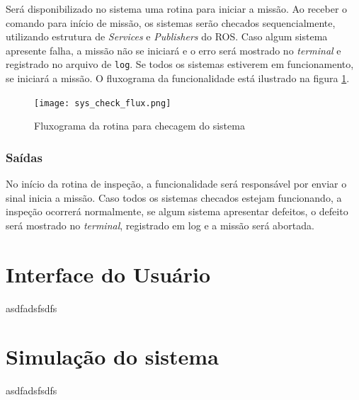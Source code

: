 Será disponibilizado no sistema uma rotina para iniciar a missão. Ao receber o comando para início de missão, os sistemas serão checados sequencialmente, utilizando estrutura de \textit{Services} e \textit{Publishers} do ROS. Caso algum sistema apresente falha, a missão não se iniciará e o erro será mostrado no \textit{terminal} e registrado no arquivo de \verb|log|. Se todos os sistemas estiverem em funcionamento, se iniciará a missão. O fluxograma da funcionalidade está ilustrado na figura \ref{fig:sys_check_flux}.	
\begin{figure}[h]
	\centering
	\texttt{[image: sys\_check\_flux.png]}
	\caption{Fluxograma da rotina para checagem do sistema}
	\label{fig:sys_check_flux}
\end{figure} 


\subsubsection{Saídas}
No início da rotina de inspeção, a funcionalidade será responsável por enviar o sinal inicia a missão. Caso todos os sistemas checados estejam funcionando, a inspeção ocorrerá normalmente, se algum sistema apresentar defeitos, o defeito será mostrado no \textit{terminal}, registrado em log e a missão será abortada.
\section{Interface do Usuário}
\label{sec:ui}
asdfadsfsdfs

\section{Simulação do sistema}
\label{sec:sim}
asdfadsfsdfs


